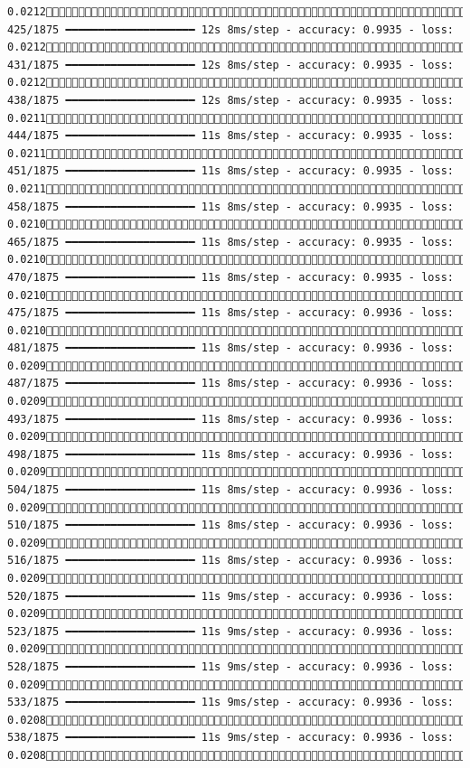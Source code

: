 \documentclass[
  letterpaper,
  DIV=11,
  numbers=noendperiod]{scrreprt}
\begin{document}
\begin{verbatim}
0.0212 425/1875 ━━━━━━━━━━━━━━━━━━━━ 12s 8ms/step - accuracy: 0.9935 - loss: 0.0212 431/1875 ━━━━━━━━━━━━━━━━━━━━ 12s 8ms/step - accuracy: 0.9935 - loss: 0.0212 438/1875 ━━━━━━━━━━━━━━━━━━━━ 12s 8ms/step - accuracy: 0.9935 - loss: 0.0211 444/1875 ━━━━━━━━━━━━━━━━━━━━ 11s 8ms/step - accuracy: 0.9935 - loss: 0.0211 451/1875 ━━━━━━━━━━━━━━━━━━━━ 11s 8ms/step - accuracy: 0.9935 - loss: 0.0211 458/1875 ━━━━━━━━━━━━━━━━━━━━ 11s 8ms/step - accuracy: 0.9935 - loss: 0.0210 465/1875 ━━━━━━━━━━━━━━━━━━━━ 11s 8ms/step - accuracy: 0.9935 - loss: 0.0210 470/1875 ━━━━━━━━━━━━━━━━━━━━ 11s 8ms/step - accuracy: 0.9935 - loss: 0.0210 475/1875 ━━━━━━━━━━━━━━━━━━━━ 11s 8ms/step - accuracy: 0.9936 - loss: 0.0210 481/1875 ━━━━━━━━━━━━━━━━━━━━ 11s 8ms/step - accuracy: 0.9936 - loss: 0.0209 487/1875 ━━━━━━━━━━━━━━━━━━━━ 11s 8ms/step - accuracy: 0.9936 - loss: 0.0209 493/1875 ━━━━━━━━━━━━━━━━━━━━ 11s 8ms/step - accuracy: 0.9936 - loss: 0.0209 498/1875 ━━━━━━━━━━━━━━━━━━━━ 11s 8ms/step - accuracy: 0.9936 - loss: 0.0209 504/1875 ━━━━━━━━━━━━━━━━━━━━ 11s 8ms/step - accuracy: 0.9936 - loss: 0.0209 510/1875 ━━━━━━━━━━━━━━━━━━━━ 11s 8ms/step - accuracy: 0.9936 - loss: 0.0209 516/1875 ━━━━━━━━━━━━━━━━━━━━ 11s 8ms/step - accuracy: 0.9936 - loss: 0.0209 520/1875 ━━━━━━━━━━━━━━━━━━━━ 11s 9ms/step - accuracy: 0.9936 - loss: 0.0209 523/1875 ━━━━━━━━━━━━━━━━━━━━ 11s 9ms/step - accuracy: 0.9936 - loss: 0.0209 528/1875 ━━━━━━━━━━━━━━━━━━━━ 11s 9ms/step - accuracy: 0.9936 - loss: 0.0209 533/1875 ━━━━━━━━━━━━━━━━━━━━ 11s 9ms/step - accuracy: 0.9936 - loss: 0.0208 538/1875 ━━━━━━━━━━━━━━━━━━━━ 11s 9ms/step - accuracy: 0.9936 - loss: 0.0208 
\end{verbatim}
\end{document}
